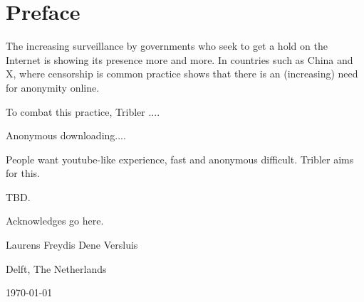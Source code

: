 \chapter*{Preface}
The increasing surveillance by governments who seek to get a hold on the Internet is showing its presence more and more.
In countries such as China and X, where censorship is common practice shows that there is an (increasing) need for anonymity online.

To combat this practice, Tribler ....

Anonymous downloading....

People want youtube-like experience, fast and anonymous difficult. Tribler aims for this.

TBD.

\vspace{1\baselineskip}

\noindent
Acknowledges go here.

\vspace{1\baselineskip}

\noindent
Laurens Freydis Dene Versluis

\vspace{1\baselineskip}

\noindent
Delft, The Netherlands

\noindent
\today
